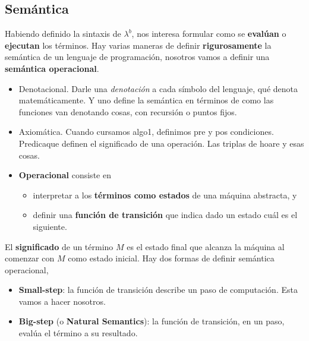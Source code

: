 \documentclass{report}
\theoremstyle{definition} %
\newcommand{\lambdab}{\lambda^b}
\begin{document}
\subsection{Semántica}

Habiendo definido la sintaxis de $\lambdab$, nos interesa formular como se
\textbf{evalúan} o \textbf{ejecutan} los términos. Hay varias maneras de definir
\textbf{rigurosamente} la semántica de un lenguaje de programación, nosotros
vamos a definir una \textbf{semántica operacional}.

\begin{itemize}
    \item Denotacional. Darle una \textit{denotación} a cada símbolo del
    lenguaje, qué denota matemáticamente. Y uno define la semántica en términos
    de como las funciones van denotando cosas, con recursión o puntos fijos.
    \item Axiomática. Cuando cursamos algo1, definimos pre y pos condiciones.
    Predicaque definen el significado de una operación. Las triplas de hoare y
    esas cosas.
    \item \textbf{Operacional} consiste en
    \begin{itemize}
        \item interpretar a los \textbf{términos como estados} de una máquina
        abstracta, y
        \item definir una \textbf{función de transición} que indica dado un
        estado cuál es el siguiente. 
    \end{itemize}
\end{itemize}

El \textbf{significado} de un término $M$ es el estado final que alcanza la
máquina al comenzar con $M$ como estado inicial. Hay dos formas de definir
semántica operacional,

\begin{itemize}
    \item \textbf{Small-step}: la función de transición describe un paso de
    computación. Esta vamos a hacer nosotros.
    \item \textbf{Big-step} (o \textbf{Natural Semantics}): la función de
    transición, en un paso, evalúa el término a su resultado.
\end{itemize}
\end{document}
